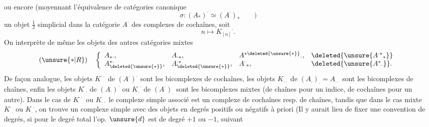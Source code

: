 ou encore (moyennant l'équivalence de catégories canonique
\[
 \sigma:(A_*)^{\cdot}\simeq(A^{\cdot})_*\qquad)
\]
un objet $\tfrac12$ simplicial dans la catégorie $A^{\cdot}$ des complexes
de cochaînes, soit
\[
 n\longmapsto {K_{[n]}}^{\cdot}.
\]
On interprète de même les objets des autres catégories mixtes
\[
 (\unsure{*|R})\quad
 \left\{\begin{array}{llll}
 A_{*\cdot},&A_{\cdot*},&{A^{*\deleted{\unsure{*}}}}_{\cdot},&
 \deleted{\unsure{{A^{\cdot*}}_*}}\\
 A^{*\cdot}_{\deleted{\unsure{*}}},&A^{\cdot*}_{\deleted{\unsure{*}}},&
 {A^{\cdot}}_*,&\deleted{\unsure{{A^*}_{\cdot}}}.
 \end{array}\right.
\]
De façon analogue, les objets $K^{\cdot\cdot}$ de $(A^{\cdot})^{\cdot}$
sont les bicomplexes de cochaînes, les objets $K_{\cdot\cdot}$ de
$(A_{\cdot})_{\cdot}=A_{\cdot\cdot}$ sont les bicomplexes de chaînes,
enfin les objets ${K^{\cdot}}_{\cdot}$ de $(A_{\cdot})^{\cdot}$ ou
${K_{\cdot}}^{\cdot}$ de $(A^{\cdot})_{\cdot}$ sont les bicomplexes mixtes
 (de chaînes pour un indice, de cochaînes pour
un autre). Dans le cas de $K^{\cdot\cdot}$ ou $K_{\cdot\cdot}$ le complexe
simple associé est un complexe de cochaînes resp. de chaînes, tandis que
dans le cas mixte ${K^{\cdot}}_{\cdot}$ ou ${K_{\cdot}}^{\cdot}$, on trouve
un complexe simple avec des objets en degrés positifs ou négatifs à priori
(Il y aurait lieu de fixer une convention de degrés, si pour le degré total
l'op. $\unsure{d}$ est de degré $+1$ ou $-1$, suivant
